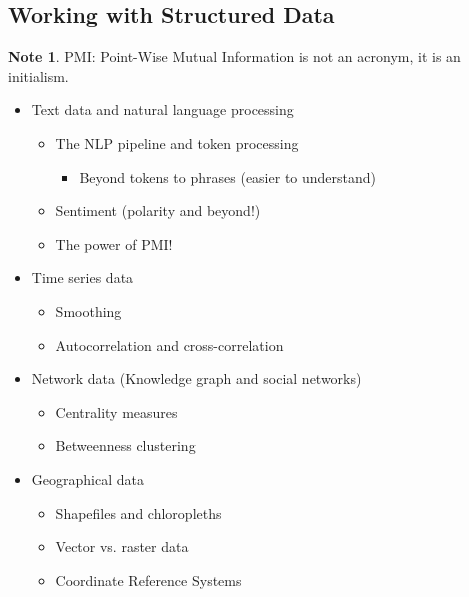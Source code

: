 \documentclass[11pt]{article}
\theoremstyle{definition}
\newtheorem{note}{Note}
\begin{document}
\subsection{Working with Structured Data}
\begin{note}
  PMI: Point-Wise Mutual Information is not an acronym, it is an initialism.
\end{note}
\begin{itemize}
  \item Text data and natural language processing
  \begin{itemize}
    \item The NLP pipeline and token processing
    \begin{itemize}
      \item Beyond tokens to phrases (easier to understand)
    \end{itemize}
    \item Sentiment (polarity and beyond!)
    \item The power of PMI!
  \end{itemize}
  \item Time series data
  \begin{itemize}
    \item Smoothing
    \item Autocorrelation and cross-correlation
  \end{itemize}
  \item Network data (Knowledge graph and social networks)
  \begin{itemize}
    \item Centrality measures
    \item Betweenness clustering
  \end{itemize}
  \item Geographical data
  \begin{itemize}
    \item Shapefiles and chloropleths
    \item Vector vs. raster data
    \item Coordinate Reference Systems
  \end{itemize}
\end{itemize}
\end{document}
